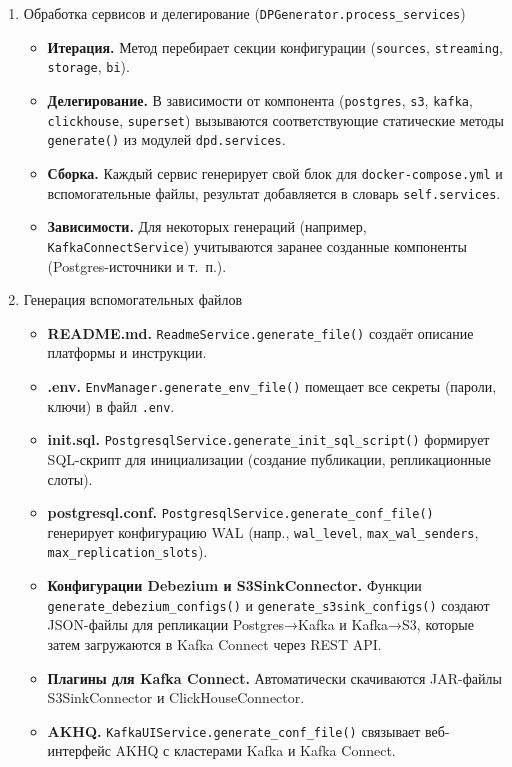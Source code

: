 \begin{enumerate}[1.]
      \item Обработка сервисов и делегирование (\texttt{DPGenerator.process\_services})
            \begin{itemize}
                  \item \textbf{Итерация.} Метод перебирает секции конфигурации (\texttt{sources}, \texttt{streaming}, \texttt{storage}, \texttt{bi}).
                  \item \textbf{Делегирование.} В зависимости от компонента (\texttt{postgres}, \texttt{s3}, \texttt{kafka}, \texttt{clickhouse}, \texttt{superset}) вызываются соответствующие статические методы \texttt{generate()} из модулей \texttt{dpd.services}.
                  \item \textbf{Сборка.} Каждый сервис генерирует свой блок для \texttt{docker-compose.yml} и вспомогательные файлы, результат добавляется в словарь \texttt{self.services}.
                  \item \textbf{Зависимости.} Для некоторых генераций (например, \texttt{KafkaConnectService}) учитываются заранее созданные компоненты (Postgres-источники и т.~п.).
            \end{itemize}

      \item Генерация вспомогательных файлов
            \begin{itemize}
                  \item \textbf{README.md.} \texttt{ReadmeService.generate\_file()} создаёт описание платформы и инструкции.
                  \item \textbf{.env.} \texttt{EnvManager.generate\_env\_file()} помещает все секреты (пароли, ключи) в файл \texttt{.env}.
                  \item \textbf{init.sql.} \texttt{PostgresqlService.generate\_init\_sql\_script()} формирует SQL-скрипт для инициализации (создание публикации, репликационные слоты).
                  \item \textbf{postgresql.conf.} \texttt{PostgresqlService.generate\_conf\_file()} генерирует конфигурацию WAL (напр., \texttt{wal\_level}, \texttt{max\_wal\_senders}, \texttt{max\_replication\_slots}).
                  \item \textbf{Конфигурации Debezium и S3SinkConnector.} Функции \texttt{generate\_debezium\_configs()} и \texttt{generate\_s3sink\_configs()} создают JSON-файлы для репликации Postgres→Kafka и Kafka→S3, которые затем загружаются в Kafka Connect через REST API.
                  \item \textbf{Плагины для Kafka Connect.} Автоматически скачиваются JAR-файлы S3SinkConnector и ClickHouseConnector.
                  \item \textbf{AKHQ.} \texttt{KafkaUIService.generate\_conf\_file()} связывает веб-интерфейс AKHQ с кластерами Kafka и Kafka Connect.
            \end{itemize}


\end{enumerate}

